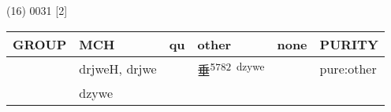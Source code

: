 \documentclass[14pt,a4paper]{scrartcl}
\begin{document}
(16) 0031 {[}2{]}

\begin{longtable}[c]{@{}llllll@{}}
\toprule
\begin{minipage}[b]{0.14\columnwidth}\raggedright\strut
GROUP
\strut\end{minipage} &
\begin{minipage}[b]{0.14\columnwidth}\raggedright\strut
MCH
\strut\end{minipage} &
\begin{minipage}[b]{0.14\columnwidth}\raggedright\strut
qu
\strut\end{minipage} &
\begin{minipage}[b]{0.14\columnwidth}\raggedright\strut
other
\strut\end{minipage} &
\begin{minipage}[b]{0.14\columnwidth}\raggedright\strut
none
\strut\end{minipage} &
\begin{minipage}[b]{0.14\columnwidth}\raggedright\strut
PURITY
\strut\end{minipage}\tabularnewline
\midrule
\endhead
\begin{minipage}[t]{0.14\columnwidth}\raggedright\strut
𠂹
\strut\end{minipage} &
\begin{minipage}[t]{0.14\columnwidth}\raggedright\strut
drjweH, drjwe
\strut\end{minipage} &
\begin{minipage}[t]{0.14\columnwidth}\raggedright\strut
\strut\end{minipage} &
\begin{minipage}[t]{0.14\columnwidth}\raggedright\strut
垂\textsuperscript{5782~dzywe}
\strut\end{minipage} &
\begin{minipage}[t]{0.14\columnwidth}\raggedright\strut
\strut\end{minipage} &
\begin{minipage}[t]{0.14\columnwidth}\raggedright\strut
pure:other
\strut\end{minipage}\tabularnewline
\begin{minipage}[t]{0.14\columnwidth}\raggedright\strut
𡍮
\strut\end{minipage} &
\begin{minipage}[t]{0.14\columnwidth}\raggedright\strut
dzywe
\strut\end{minipage} &
\begin{minipage}[t]{0.14\columnwidth}\raggedright\strut

\end{minipage}
\end{longtable}
\end{document}
